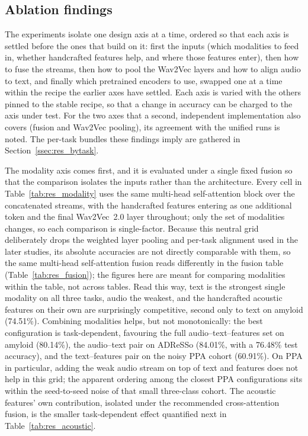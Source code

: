 \subsection{Ablation findings}
\label{ssec:res_ablation}

The experiments isolate one design axis at a time, ordered so that each axis is settled before the ones that build on it: first the inputs (which modalities to feed in, whether handcrafted features help, and where those features enter), then how to fuse the streams, then how to pool the Wav2Vec layers and how to align audio to text, and finally which pretrained encoders to use, swapped one at a time within the recipe the earlier axes have settled. Each axis is varied with the others pinned to the stable recipe, so that a change in accuracy can be charged to the axis under test. For the two axes that a second, independent implementation also covers (fusion and Wav2Vec pooling), its agreement with the unified runs is noted. The per-task bundles these findings imply are gathered in Section~\ref{ssec:res_bytask}.

The modality axis comes first, and it is evaluated under a single fixed fusion so that the comparison isolates the inputs rather than the architecture. Every cell in Table~\ref{tab:res_modality} uses the same multi-head self-attention block over the concatenated streams, with the handcrafted features entering as one additional token and the final Wav2Vec~2.0 layer throughout; only the set of modalities changes, so each comparison is single-factor. Because this neutral grid deliberately drops the weighted layer pooling and per-task alignment used in the later studies, its absolute accuracies are not directly comparable with them, so the same multi-head self-attention fusion reads differently in the fusion table (Table~\ref{tab:res_fusion}); the figures here are meant for comparing modalities within the table, not across tables. Read this way, text is the strongest single modality on all three tasks, audio the weakest, and the handcrafted acoustic features on their own are surprisingly competitive, second only to text on amyloid (74.51\%). Combining modalities helps, but not monotonically: the best configuration is task-dependent, favouring the full audio--text--features set on amyloid (80.14\%), the audio--text pair on ADReSSo (84.01\%, with a 76.48\% test accuracy), and the text--features pair on the noisy PPA cohort (60.91\%). On PPA in particular, adding the weak audio stream on top of text and features does not help in this grid; the apparent ordering among the closest PPA configurations sits within the seed-to-seed noise of that small three-class cohort. The acoustic features' own contribution, isolated under the recommended cross-attention fusion, is the smaller task-dependent effect quantified next in Table~\ref{tab:res_acoustic}.


